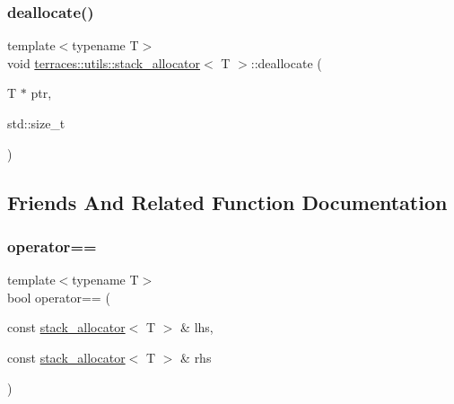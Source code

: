 \mbox{\label{classterraces_1_1utils_1_1stack__allocator_a804f63d9b9f82e5462dae9a43144ec82}} 
\subsubsection{\texorpdfstring{deallocate()}{deallocate()}}
{\footnotesize\ttfamily template$<$typename T$>$ \\
void \hyperlink{classterraces_1_1utils_1_1stack__allocator}{terraces\+::utils\+::stack\+\_\+allocator}$<$ T $>$\+::deallocate (\begin{DoxyParamCaption}\item[{T $\ast$}]{ptr,  }\item[{std\+::size\+\_\+t}]{ }\end{DoxyParamCaption})\hspace{0.3cm}{\ttfamily [inline]}}



\subsection{Friends And Related Function Documentation}
\mbox{\label{classterraces_1_1utils_1_1stack__allocator_a4f03647bb7adb25d049daf9e4e741301}} 
\subsubsection{\texorpdfstring{operator==}{operator==}}
{\footnotesize\ttfamily template$<$typename T$>$ \\
bool operator== (\begin{DoxyParamCaption}\item[{const \hyperlink{classterraces_1_1utils_1_1stack__allocator}{stack\+\_\+allocator}$<$ T $>$ \&}]{lhs,  }\item[{const \hyperlink{classterraces_1_1utils_1_1stack__allocator}{stack\+\_\+allocator}$<$ T $>$ \&}]{rhs }\end{DoxyParamCaption})\hspace{0.3cm}{\ttfamily [friend]}}

